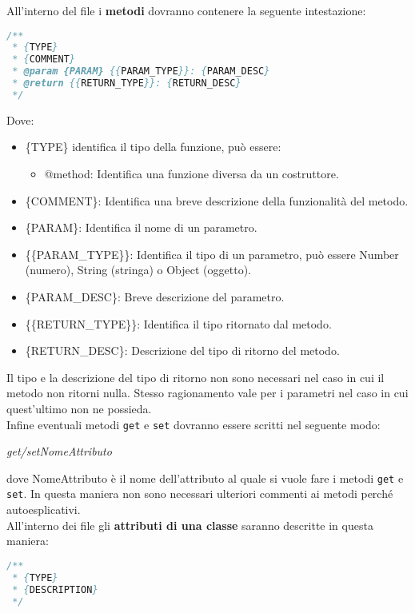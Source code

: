 All'interno del file i \textbf{metodi} dovranno contenere la seguente intestazione:

\begin{lstlisting}[language=Java]
/**
 * {TYPE}
 * {COMMENT}
 * @param {PARAM} {{PARAM_TYPE}}: {PARAM_DESC}
 * @return {{RETURN_TYPE}}: {RETURN_DESC} 
 */
\end{lstlisting}

Dove:
\begin{itemize}
\item \{TYPE\} identifica il tipo della funzione, può essere:
\begin {itemize}
\item @method: Identifica una funzione diversa da un costruttore.
\end{itemize}
\item \{COMMENT\}: Identifica una breve descrizione della funzionalità del metodo.
\item \{PARAM\}: Identifica il nome di un parametro.
\item \{\{PARAM\_TYPE\}\}: Identifica il tipo di un parametro, può essere Number (numero), String (stringa) o Object (oggetto).
\item \{PARAM\_DESC\}: Breve descrizione del parametro.
\item \{\{RETURN\_TYPE\}\}: Identifica il tipo ritornato dal metodo.
\item \{RETURN\_DESC\}: Descrizione del tipo di ritorno del metodo.
\end{itemize}
Il tipo e la descrizione del tipo di ritorno non sono necessari nel caso in cui il metodo non ritorni nulla. Stesso ragionamento vale per i parametri nel caso in cui quest'ultimo non ne possieda.
\\



Infine eventuali metodi \texttt{get} e \texttt{set} dovranno essere scritti nel seguente modo:
\begin{center}
\textit{get/setNomeAttributo}
\end{center}
dove NomeAttributo è il nome dell'attributo al quale si vuole fare i metodi \texttt{get} e \texttt{set}. In questa maniera non sono necessari ulteriori commenti ai metodi perché autoesplicativi.
\\



All'interno dei file gli \textbf{attributi di una classe} saranno descritte in questa maniera:

\begin{lstlisting}[language=Java]
/**
 * {TYPE}
 * {DESCRIPTION}
 */ 
\end{lstlisting}

